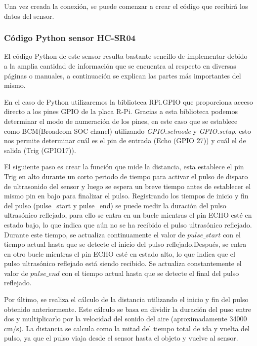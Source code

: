 Una vez creada la conexión, se puede comenzar a crear el código que recibirá los datos del sensor. 

\newpage
\subsubsection{Código Python sensor HC-SR04}

El código Python de este sensor resulta bastante sencillo de implementar debido a la amplia cantidad de información que se encuentra al respecto en diversas páginas o manuales, a continuación se explican las partes más importantes del mismo. 

En el caso de Python utilizaremos la biblioteca RPi.GPIO que proporciona acceso directo a los pines GPIO de la placa R-Pi. Gracias a esta biblioteca podemos determinar el modo de numeración de los pines, en este caso que se establece como BCM(Broadcom SOC chanel) utilizando \textit{GPIO.setmode} y \textit{GPIO.setup}, esto nos permite determinar cuál es el pin de entrada (Echo (GPIO 27)) y cuál el de salida (Trig (GPIO17)).

El siguiente paso es crear la función que mide la distancia, esta establece el pin Trig en alto durante un corto periodo de tiempo para activar el pulso de disparo de ultrasonido del sensor y luego se espera un breve tiempo antes de establecer el mismo pin en bajo para finalizar el pulso. Registrando los tiempos de inicio y fin del pulso (pulse\_start y pulse\_end) se puede medir la duración del pulso ultrasónico reflejado, para ello se entra en un bucle mientras el pin ECHO esté en estado bajo, lo que indica que aún no se ha recibido el pulso ultrasónico reflejado. Durante este tiempo, se actualiza continuamente el valor de $pulse\_start$ con el tiempo actual hasta que se detecte el inicio del pulso reflejado.Después, se entra en otro bucle mientras el pin ECHO esté en estado alto, lo que indica que el pulso ultrasónico reflejado está siendo recibido. Se actualiza constantemente el valor de $pulse\_end$ con el tiempo actual hasta que se detecte el final del pulso reflejado.

Por último, se realiza el cálculo de la distancia utilizando el inicio y fin del pulso obtenido anteriormente. Este cálculo se basa en dividir la duración del puso entre dos y multiplicarlo por la velocidad del sonido del aire (aproximadamente 34000 cm/s). La distancia se calcula como la mitad del tiempo total de ida y vuelta del pulso, ya que el pulso viaja desde el sensor hasta el objeto y vuelve al sensor.

